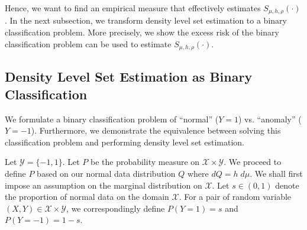 \documentclass{article}
\begin{document}
Hence, we want to find an empirical measure that effectively estimates $S_{\mu,h,\rho}(\cdot)$.
In the next subsection, we transform density level set estimation to a binary classification problem.
More precisely, we show the excess risk of the binary classification problem can be used to estimate $S_{\mu,h,\rho}(\cdot)$. 
% 

\subsection{Density Level Set Estimation as Binary Classification}
We formulate a binary classification problem of ``normal'' ($Y=1$) vs. ``anomaly'' ($Y=-1$). Furthermore, we demonstrate the equivalence between solving this classification problem and performing density level set estimation.

Let $\mathcal{Y}=\{-1,1\}$. Let $P$ be the probability measure on $\mathcal{X} \times \mathcal{Y}$. 
We proceed to define $P$ based on our normal data distribution $Q$ where $dQ = h \; d\mu$.
We shall first impose an assumption on the marginal distribution on $\mathcal{X}$. 
Let $s \in (0,1)$ denote the proportion of normal data on the domain $\mathcal{X}$. 
For a pair of random variable $(X,Y) \in \mathcal{X} \times \mathcal{Y}$, we correspondingly define $P(Y=1)=s$ and $P(Y=-1)=1-s$. 
\end{document}
